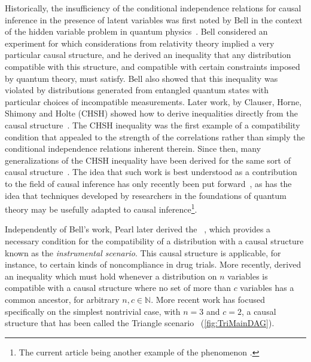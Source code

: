 \documentclass[aps,english,10pt,superscriptaddress,onecolumn,twoside,longbibliography,pra,floatfix,fleqn,nofootinbib]{revtex4-1}%
\newcommand*{\tblue}[1]{{\color{MidnightBlue}{\textbf{#1}}}}
\theoremstyle{definition}
\newcounter{example}[section]
\begin{document}
Historically, the insufficiency of the conditional independence relations for causal inference in the presence of latent variables was first
noted by Bell in the context of the hidden variable problem in quantum physics~\cite{bell1964einstein}. Bell considered an experiment for which considerations from relativity theory implied a very particular causal structure, and he derived an inequality
that any distribution compatible with this structure, and compatible with certain constraints imposed by quantum
theory, must satisfy. Bell also showed that this inequality was violated by distributions generated from entangled
quantum states with particular choices of incompatible measurements. Later work, by Clauser, Horne, Shimony and
Holte (CHSH) showed how to derive inequalities directly from the causal structure~\cite{CHSHOriginal}. The CHSH inequality was the
first example of a compatibility condition that appealed to the strength of the correlations rather than simply the
conditional independence relations inherent therein.
Since then, many generalizations of the CHSH inequality have been derived for the same sort of causal structure~\cite{Brunner2013Bell}. The idea that such work is best understood as a contribution to the field of causal inference has only recently been put forward~\cite{WoodSpekkens,fritz2012bell,pusey2014gdag,BeyondBellII}, as has the idea that techniques developed by researchers in the foundations of quantum theory may be usefully adapted to causal inference\footnote{The current article being another example of the phenomenon \cite{BeyondBellII,ChavesNoSignalling,chaves2014informationinference,weilenmann2016entropic,kela2016covariance,ChavesPolynomial,TavakoliStarNetworks,RossetNetworks,TavakoliNoncyclicNetworks}.}.

Independently of Bell's work, Pearl later derived the \tblue{instrumental inequality}~\cite{pearl1995instrumental}, which provides a necessary condition for the compatibility of a distribution with a causal structure known as the \emph{instrumental scenario}.  This causal structure is applicable, for instance, to certain kinds of noncompliance in drug trials. More recently, \citet{steudel2010ancestors} derived an inequality which must hold whenever a distribution on $n$ variables is compatible with a causal structure where no set of more than $c$ variables has a common ancestor, for arbitrary $n,c \in \mathbb{N}$. More recent work has focused specifically on the simplest nontrivial case, with $n=3$ and $c=2$, a causal structure that has been called the Triangle scenario~\cite{fritz2012bell,chaves2014novel} (\cref{fig:TriMainDAG}).
\end{document}
